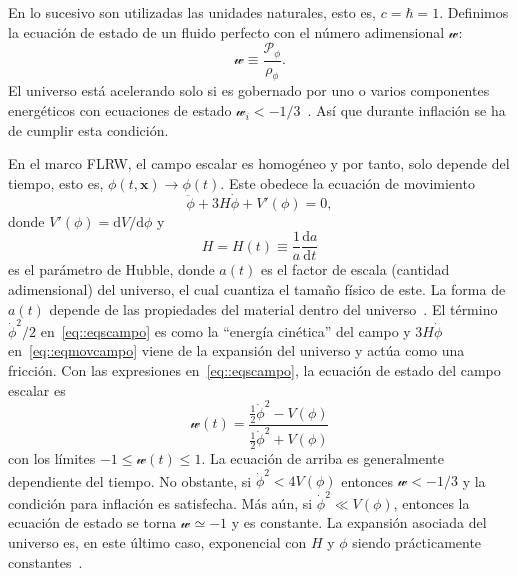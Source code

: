 En lo sucesivo son utilizadas las unidades naturales, esto es, \(c=\hbar=1\). Definimos la ecuación de estado de un fluido perfecto con el número adimensional \(\mathscr{w}\):
\begin{equation}
    \mathscr{w}\equiv\frac{\mathcal{P}_\phi}{\rho_\phi}.
\end{equation}
El universo está acelerando solo si es gobernado por uno o varios componentes energéticos con ecuaciones de estado \(\mathscr{w}_i<-1/3\)~\cite{knobel2012introduction}. Así que durante inflación se ha de cumplir esta condición.

En el marco FLRW, el campo escalar es homogéneo y por tanto, solo depende del tiempo, esto es, \(\phi\left(t,\symbf{x}\right)\rightarrow\phi(t)\). Este obedece la ecuación de movimiento
\begin{equation}
    \ddot{\phi}+3H\dot{\phi}+V'(\phi)=0,\label{eq::eqmovcampo}
\end{equation}
donde \(V'(\phi)=\mathrm{d}V/\mathrm{d}\phi\) y
\begin{equation}
    H=H(t)\equiv \frac{1}{a}\frac{\mathrm{d}a}{\mathrm{d}t}
\end{equation}
es el parámetro de Hubble, donde \(a(t)\) es el factor de escala (cantidad adimensional) del universo, el cual cuantiza el tamaño físico de este. La forma de \(a(t)\) depende de las propiedades del material dentro del universo~\cite{liddle1998introduction}. El término \(\dot{\phi}^2/2\) en~\ref{eq::eqscampo} es como la ``energía cinética'' del campo y \(3H\dot{\phi}\) en~\ref{eq::eqmovcampo} viene de la expansión del universo y actúa como una fricción. Con las expresiones en~\ref{eq::eqscampo}, la ecuación de estado del campo escalar es
\begin{equation}
    \mathscr{w}(t)=\frac{\frac{1}{2}\dot{\phi}^2-V(\phi)}{\frac{1}{2}\dot{\phi}^2+V(\phi)}\label{eq::estado}
\end{equation}
con los límites \(-1\leq\mathscr{w}(t)\leq 1\). La ecuación de arriba es generalmente dependiente del tiempo. No obstante, si \(\dot{\phi}^2<4V(\phi)\) entonces \(\mathscr{w} < -1/3\) y la condición para inflación es satisfecha. Más aún, si \(\dot{\phi}^2 \ll V(\phi)\), entonces la ecuación de estado se torna \(\mathscr{w}\simeq -1\) y es constante. La expansión asociada del universo es, en este último caso, exponencial con \(H\) y \(\phi\) siendo prácticamente constantes~\cite{knobel2012introduction}.
